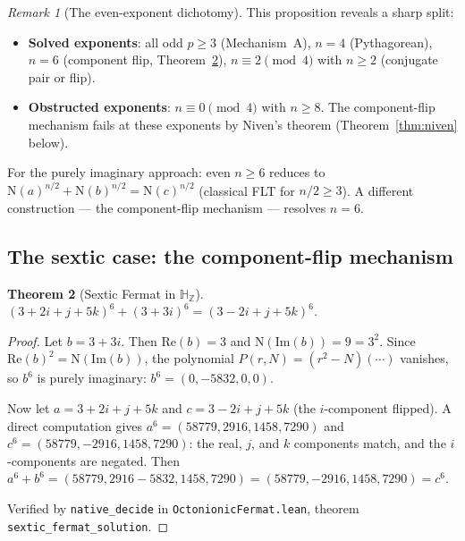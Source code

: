 \documentclass[11pt]{amsart}
\theoremstyle{plain}
\newtheorem{theorem}{Theorem}[section]
\theoremstyle{definition}
\theoremstyle{remark}
\newtheorem{remark}[theorem]{Remark}
\newcommand{\Z}{\mathbb{Z}}
\newcommand{\HH}{\mathbb{H}}
\newcommand{\Norm}[1]{\mathrm{N}(#1)}
\begin{document}
\begin{remark}[The even-exponent dichotomy]
This proposition reveals a sharp split:
\begin{itemize}
  \item \textbf{Solved exponents}: all odd $p \geq 3$ (Mechanism~A),
    $n = 4$ (Pythagorean), $n = 6$ (component flip, Theorem~\ref{thm:sextic}),
    $n \equiv 2 \pmod{4}$ with $n \geq 2$ (conjugate pair or flip).
  \item \textbf{Obstructed exponents}: $n \equiv 0 \pmod{4}$ with $n \geq 8$.
    The component-flip mechanism fails at these exponents by Niven's theorem
    (Theorem~\ref{thm:niven} below).
\end{itemize}
For the purely imaginary approach: even $n \geq 6$ reduces to
$\Norm{a}^{n/2} + \Norm{b}^{n/2} = \Norm{c}^{n/2}$ (classical FLT for $n/2 \geq 3$).
A different construction --- the component-flip mechanism --- resolves $n = 6$.
\end{remark}

\subsection{The sextic case: the component-flip mechanism}

\begin{theorem}[Sextic Fermat in $\HH_\Z$]\label{thm:sextic}
$(3 + 2i + j + 5k)^6 + (3 + 3i)^6 = (3 - 2i + j + 5k)^6$.
\end{theorem}

\begin{proof}
Let $b = 3 + 3i$. Then $\mathrm{Re}(b) = 3$ and $\Norm{\mathrm{Im}(b)} = 9 = 3^2$.
Since $\mathrm{Re}(b)^2 = \Norm{\mathrm{Im}(b)}$, the polynomial $P(r, N) = (r^2 - N)(\cdots)$
vanishes, so $b^6$ is purely imaginary: $b^6 = (0, -5832, 0, 0)$.

Now let $a = 3 + 2i + j + 5k$ and $c = 3 - 2i + j + 5k$ (the $i$-component flipped).
A direct computation gives $a^6 = (58779, 2916, 1458, 7290)$ and
$c^6 = (58779, -2916, 1458, 7290)$: the real, $j$, and $k$ components match,
and the $i$-components are negated.
Then $a^6 + b^6 = (58779, 2916 - 5832, 1458, 7290) = (58779, -2916, 1458, 7290) = c^6$.

Verified by \texttt{native\_decide} in \texttt{OctonionicFermat.lean},
theorem \texttt{sextic\_fermat\_solution}.
\end{proof}
\end{document}
